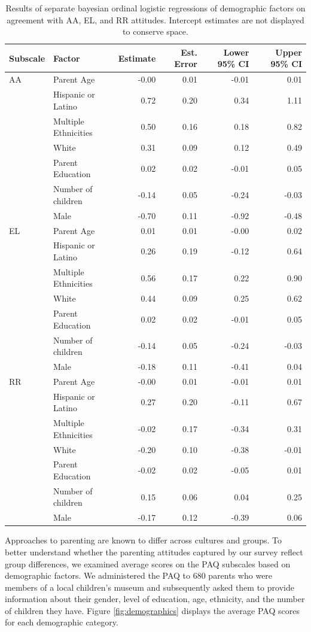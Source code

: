 \documentclass[man]{apa6}
\theoremstyle{definition}
\theoremstyle{definition}
\theoremstyle{definition}
\theoremstyle{remark}
\begin{document}
\begin{table}[h]
\centering
\begin{tabular}{llrrrr}
  \hline
Subscale & Factor & Estimate & Est. Error & Lower 95\% CI & Upper 95\% CI \\ 
  \hline
AA & Parent Age & -0.00 & 0.01 & -0.01 & 0.01 \\ 
   & Hispanic or Latino & 0.72 & 0.20 & 0.34 & 1.11 \\ 
   & Multiple Ethnicities & 0.50 & 0.16 & 0.18 & 0.82 \\ 
   & White & 0.31 & 0.09 & 0.12 & 0.49 \\ 
   & Parent Education & 0.02 & 0.02 & -0.01 & 0.05 \\ 
   & Number of children & -0.14 & 0.05 & -0.24 & -0.03 \\ 
   & Male & -0.70 & 0.11 & -0.92 & -0.48 \\ 
   \hline
EL & Parent Age & 0.01 & 0.01 & -0.00 & 0.02 \\ 
   & Hispanic or Latino & 0.26 & 0.19 & -0.12 & 0.64 \\ 
   & Multiple Ethnicities & 0.56 & 0.17 & 0.22 & 0.90 \\ 
   & White & 0.44 & 0.09 & 0.25 & 0.62 \\ 
   & Parent Education & 0.02 & 0.02 & -0.01 & 0.05 \\ 
   & Number of children & -0.14 & 0.05 & -0.24 & -0.03 \\ 
   & Male & -0.18 & 0.11 & -0.41 & 0.04 \\ 
   \hline
RR & Parent Age & -0.00 & 0.01 & -0.01 & 0.01 \\ 
   & Hispanic or Latino & 0.27 & 0.20 & -0.11 & 0.67 \\ 
   & Multiple Ethnicities & -0.02 & 0.17 & -0.34 & 0.31 \\ 
   & White & -0.20 & 0.10 & -0.38 & -0.01 \\ 
   & Parent Education & -0.02 & 0.02 & -0.05 & 0.01 \\ 
   & Number of children & 0.15 & 0.06 & 0.04 & 0.25 \\ 
   & Male & -0.17 & 0.12 & -0.39 & 0.06 \\ 
   \hline
\end{tabular}
\caption{Results of separate bayesian ordinal logistic regressions of demographic factors on agreement with AA, EL, and RR attitudes. Intercept estimates are not displayed to conserve space.} 
\end{table}

Approaches to parenting are known to differ across cultures and groups.
To better understand whether the parenting attitudes captured by our
survey reflect group differences, we examined average scores on the PAQ
subscales based on demographic factors. We administered the PAQ to 680
parents who were members of a local children's museum and subsequently
asked them to provide information about their gender, level of
education, age, ethnicity, and the number of children they have. Figure
\ref{fig:demographics} displays the average PAQ scores for each
demographic category.
\end{document}
